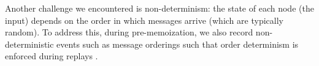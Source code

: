 Another challenge we encountered is non-determinism: the state of each
node (the input) depends on the order in which messages arrive (which are
typically random).
%
To address this, during pre-memoization, we also record non-deterministic
events such as message orderings such that order determinism is enforced
during replays \cite{Geels+07-Friday}.







